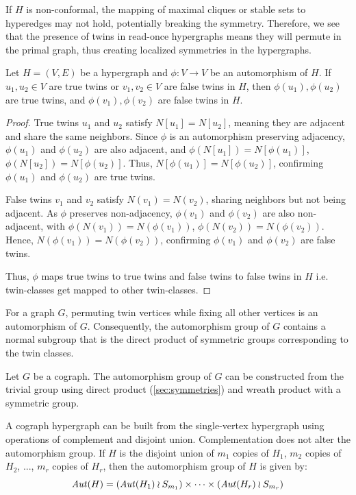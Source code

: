 If $H$ is non-conformal, the mapping of maximal cliques or stable sets to hyperedges may not hold, potentially breaking the symmetry. Therefore, we see that the presence of twins in read-once hypergraphs means they will permute in the primal graph, thus creating localized symmetries in the hypergraphs.

\begin{lemma}\label{lem:twins-map}
Let $H=(V,E)$ be a hypergraph and $\phi:V\to V$ be an automorphism of $H$. If $u_1,u_2\in V$ are true twins or $v_1,v_2\in V$ are false twins in $H$, then $\phi(u_1),\phi(u_2)$ are true twins, and $\phi(v_1),\phi(v_2)$ are false twins in $H$.
\end{lemma}

\begin{proof}
True twins $u_1$ and $u_2$ satisfy $N[u_1]=N[u_2]$, meaning they are adjacent and share the same neighbors. Since $\phi$ is an automorphism preserving adjacency, $\phi(u_1)$ and $\phi(u_2)$ are also adjacent, and $\phi(N[u_1])=N[\phi(u_1)]$, $\phi(N[u_2])=N[\phi(u_2)]$. Thus, $N[\phi(u_1)]=N[\phi(u_2)]$, confirming $\phi(u_1)$ and $\phi(u_2)$ are true twins.

False twins $v_1$ and $v_2$ satisfy $N(v_1)=N(v_2)$, sharing neighbors but not being adjacent. As $\phi$ preserves non-adjacency, $\phi(v_1)$ and $\phi(v_2)$ are also non-adjacent, with $\phi(N(v_1))=N(\phi(v_1))$, $\phi(N(v_2))=N(\phi(v_2))$. Hence, $N(\phi(v_1))=N(\phi(v_2))$, confirming $\phi(v_1)$ and $\phi(v_2)$ are false twins.

Thus, $\phi$ maps true twins to true twins and false twins to false twins in $H$ i.e. twin-classes get mapped to other twin-classes.
\end{proof}

For a graph $G$, permuting twin vertices while fixing all other vertices is an automorphism of $G$. Consequently, the automorphism group of $G$ contains a normal subgroup that is the direct product of symmetric groups corresponding to the twin classes.

\begin{proposition}\label{prop:cameron}
Let $G$ be a cograph. The automorphism group of $G$ can be constructed from the trivial group using direct product (\ref{sec:symmetries}) and wreath product with a symmetric group. \cite{Cam22}
\end{proposition}

A cograph hypergraph can be built from the single-vertex hypergraph using operations of complement and disjoint union. Complementation does not alter the automorphism group. If $H$ is the disjoint union of $m_1$ copies of $H_1$, $m_2$ copies of $H_2$, ..., $m_r$ copies of $H_r$, then the automorphism group of $H$ is given by:
\[
\mathit{Aut}(H)=(\mathit{Aut}(H_1)\wr S_{m_1})\times\dots\times(\mathit{Aut}(H_r)\wr S_{m_r})
\]
